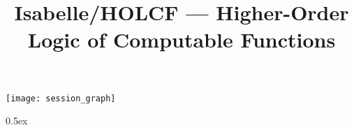 \documentclass[11pt,a4paper]{article}
\begin{document}
\title{Isabelle/HOLCF --- Higher-Order Logic of Computable Functions}
\maketitle

\tableofcontents

\begin{center}
  \texttt{[image: session\_graph]}
\end{center}

\newpage

\renewcommand{\setisabellecontext}[1]{\markright{THEORY~``#1''}}

\parindent 0pt\parskip 0.5ex

\end{document}
